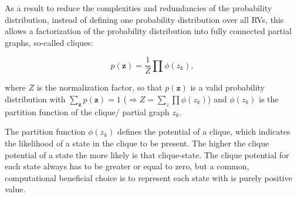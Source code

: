 As a result to reduce the complexities and redundancies of the probability distribution, instead of defining one probability distribution over all RVs, this allows a factorization of the probability distribution into fully connected partial graphs, so-called cliques:

\[
p(\textbf{z}) = \frac{1}{Z} \prod \phi (z_k)  ,
\]

where $Z$ is the normalization factor, so that $p(\textbf{z})$ is a valid probability distribution with $\sum_{\textbf{z}} p(\textbf{z}) = 1$ ($ \Rightarrow Z = \sum_z \prod \phi (z_k) $) and $\phi (z_k)$ is the partition function of the clique/ partial graph $z_k$.

The partition function $\phi (z_k)$ defines the potential of a clique, which indicates the likelihood of a state in the clique to be present.
The higher the clique potential of a state the more likely is that clique-state.
The clique potential for each state always has to be greater or equal to zero, but a common, computational beneficial choice is to represent each state with is purely positive value.

